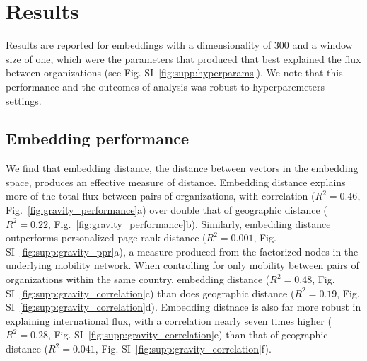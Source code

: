 \documentclass[12pt]{article} %
\begin{document}
\section{Results}\label{sec:results} %

Results are reported for embeddings with a dimensionality of 300 and a window size of one, which were the parameters that produced  that best explained the flux between organizations (see Fig. SI~\ref{fig:supp:hyperparams}). 
We note that this performance and the outcomes of analysis was robust to hyperparemeters settings. 

%
%
\subsection*{Embedding performance}

We find that embedding distance, the distance between vectors in the embedding space, produces an effective measure of distance.
Embedding distance explains more of the total flux between pairs of organizations, with correlation ($R^{2} = 0.46$, Fig.~\ref{fig:gravity_performance}a) over double that of geographic distance ($R^{2} = 0.22$, Fig.~\ref{fig:gravity_performance}b).
Similarly, embedding distance outperforms personalized-page rank distance ($R^{2} = 0.001$, Fig. SI~\ref{fig:supp:gravity_ppr}a), a measure produced from the factorized nodes in the underlying mobility network. 
When controlling for only mobility between pairs of organizations within the same country, embedding distance ($R^{2} = 0.48$, Fig. SI~\ref{fig:supp:gravity_correlation}c) than does geographic distance ($R^{2} = 0.19$, Fig. SI~\ref{fig:supp:gravity_correlation}d). 
Embedding distnace is also far more robust in explaining international flux, with a correlation nearly seven times higher ($R^{2} = 0.28$, Fig. SI~\ref{fig:supp:gravity_correlation}e) than that of geographic distance ($R^{2} = 0.041$, Fig. SI~\ref{fig:supp:gravity_correlation}f). 
\end{document}
